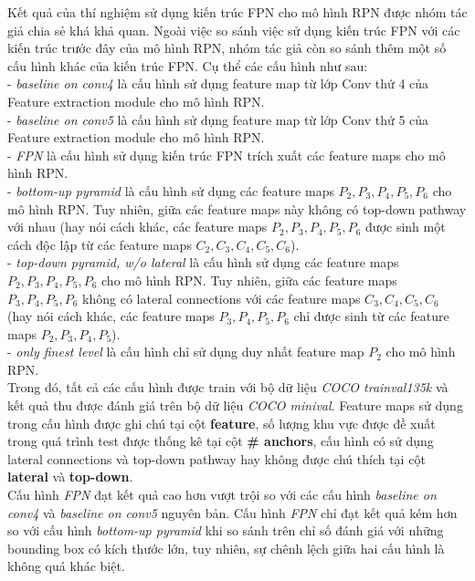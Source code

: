 {    \noindent
    Kết quả của thí nghiệm sử dụng kiến trúc FPN cho mô hình RPN được nhóm tác giả chia sẻ khá khả quan.
    Ngoài việc so sánh việc sử dụng kiến trúc FPN với các kiến trúc trước đây của mô hình RPN, nhóm tác giả còn so sánh thêm một số cấu hình khác của kiến trúc FPN.
    Cụ thể các cấu hình như sau: \\
    - \textit{baseline on conv4} là cấu hình sử dụng feature map từ lớp Conv thứ 4 của Feature extraction module cho mô hình RPN. \\
    - \textit{baseline on conv5} là cấu hình sử dụng feature map từ lớp Conv thứ 5 của Feature extraction module cho mô hình RPN. \\
    - \textit{FPN} là cấu hình sử dụng kiến trúc FPN trích xuất các feature maps cho mô hình RPN. \\
    - \textit{bottom-up pyramid} là cấu hình sử dụng các feature maps \textit{{${P}_{2}, {P}_{3}, {P}_{4}, {P}_{5}, {P}_{6}$}} cho mô hình RPN.
    Tuy nhiên, giữa các feature maps này không có top-down pathway với nhau (hay nói cách khác, các feature maps \textit{{${P}_{2}, {P}_{3}, {P}_{4}, {P}_{5}, {P}_{6}$}} được sinh một cách độc lập từ các feature maps \textit{{${C}_{2}, {C}_{3}, {C}_{4}, {C}_{5}, {C}_{6}$}}). \\
    - \textit{top-down pyramid, w/o lateral} là cấu hình sử dụng các feature maps \textit{{${P}_{2}, {P}_{3}, {P}_{4}, {P}_{5}, {P}_{6}$}} cho mô hình RPN.
    Tuy nhiên, giữa các feature maps \textit{{${P}_{3}, {P}_{4}, {P}_{5}, {P}_{6}$}} không có lateral connections với các feature maps \textit{{${C}_{3}, {C}_{4}, {C}_{5}, {C}_{6}$}} (hay nói cách khác, các feature maps \textit{{${P}_{3}, {P}_{4}, {P}_{5}, {P}_{6}$}} chỉ được sinh từ các feature maps \textit{{${P}_{2}, {P}_{3}, {P}_{4}, {P}_{5}$}}). \\
    - \textit{only finest level} là cấu hình chỉ sử dụng duy nhất feature map \textit{${P}_{2}$} cho mô hình RPN. \\
    Trong đó, tất cả các cấu hình được train với bộ dữ liệu \textit{COCO trainval135k} và kết quả thu được đánh giá trên bộ dữ liệu \textit{COCO minival}.
    Feature maps sử dụng trong cấu hình được ghi chú tại cột \textbf{feature}, số lượng khu vực được đề xuất trong quá trình test được thống kê tại cột \textbf{\# anchors}, cấu hình có sử dụng lateral connections và top-down pathway hay không được chú thích tại cột \textbf{lateral} và \textbf{top-down}. \\
    Cấu hình \textit{FPN} đạt kết quả cao hơn vượt trội so với các cấu hình \textit{baseline on conv4} và \textit{baseline on conv5} nguyên bản.
    Cấu hình \textit{FPN} chỉ đạt kết quả kém hơn so với cấu hình \textit{bottom-up pyramid} khi so sánh trên chỉ số đánh giá với những bounding box có kích thước lớn, tuy nhiên, sự chênh lệch giữa hai cấu hình là không quá khác biệt.

}
